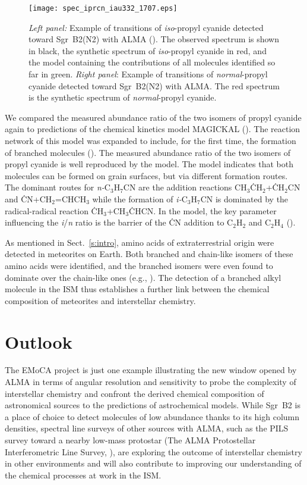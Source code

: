 \documentclass{iau}
\begin{document}
\begin{figure}
\begin{center}
\texttt{[image: spec\_iprcn\_iau332\_1707.eps]}
\end{center}
\caption{\textit{Left panel:} Example of transitions of \textit{iso}-propyl 
cyanide detected toward Sgr~B2(N2) with ALMA (\cite{Belloche14}). The observed 
spectrum is shown 
in black, the synthetic spectrum of \textit{iso}-propyl cyanide in red, and the 
model containing the contributions of all molecules identified so far in green.
\textit{Right panel}: Example of transitions of \textit{normal}-propyl 
cyanide detected toward Sgr~B2(N2) with ALMA. The red spectrum is the 
synthetic spectrum of \textit{normal}-propyl cyanide.}
\label{f:spec_prcn}
\end{figure}

We compared the measured abundance ratio of the two isomers of propyl cyanide 
again to predictions of the chemical kinetics model MAGICKAL
(\cite{Garrod13a}). The reaction network of this model was expanded to include, 
for the first time, the formation of branched molecules 
(\cite{Garrod17,Belloche14}). The measured abundance ratio of the two isomers 
of propyl cyanide is well reproduced 
by the model. The model indicates that both molecules can be formed on grain 
surfaces, but via different formation routes. The dominant routes for 
\textit{n-}C$_3$H$_7$CN are the addition reactions CH$_3$\.CH$_2$+\.CH$_2$CN 
and \.CN+CH$_2$=CHCH$_3$ while the formation of \textit{i-}C$_3$H$_7$CN is
dominated by the radical-radical reaction \.CH$_3$+CH$_3$\.CHCN. In the model, 
the key parameter influencing the \textit{i}/\textit{n} ratio is the barrier 
of the \.CN addition to C$_2$H$_2$ and C$_2$H$_4$ (\cite{Garrod17}).

As mentioned in Sect.~\ref{s:intro}, amino acids of extraterrestrial origin 
were detected in meteorites on Earth. Both branched and chain-like isomers of 
these amino acids were identified, and the branched isomers were even found to 
dominate over the chain-like ones (e.g., \cite{Cronin83}). The detection of a
branched alkyl molecule in the ISM thus establishes a further link between
the chemical composition of meteorites and interstellar chemistry.

\section{Outlook}

The EMoCA project is just one example illustrating the new window opened by 
ALMA in terms of angular resolution and sensitivity to probe the complexity of
interstellar chemistry and confront the derived chemical composition of 
astronomical sources to the predictions of astrochemical models. While Sgr~B2 
is a place of choice to detect molecules of low abundance thanks to its high 
column densities, spectral line surveys of other sources with ALMA, such as 
the PILS survey toward a 
nearby low-mass protostar (The ALMA Protostellar Interferometric Line Survey, 
\cite{Jorgensen16}), are exploring the outcome of interstellar chemistry
in other environments and will also contribute to improving our 
understanding of the chemical processes at work in the ISM.
\end{document}
